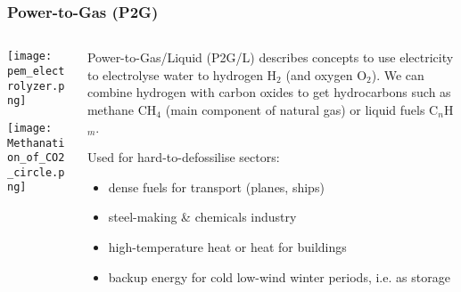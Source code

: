 \documentclass[10pt,aspectratio=169,dvipsnames]{beamer}
\let\olditem\item
\renewcommand{\item}{%
\olditem\vspace{5pt}}
\begin{document}
\begin{frame}
  \frametitle{Power-to-Gas (P2G)}

  \begin{columns}[T]
    \begin{column}{4cm}
      \texttt{[image: pem\_electrolyzer.png]}


      \vspace{.4cm}

      \texttt{[image: Methanation\_of\_CO2\_circle.png]}
    \end{column}
    \begin{column}{7cm}

      Power-to-Gas/Liquid (P2G/L) describes concepts to use electricity to
      electrolyse water to \alert{hydrogen} H$_2$ (and oxygen O$_2$).
      We can combine hydrogen with carbon oxides to get
      \alert{hydrocarbons} such as methane CH$_4$ (main component of
      natural gas) or liquid fuels C$_n$H$_m$.

      Used for \alert{hard-to-defossilise sectors}:
            \begin{itemize}
            \item
              \alert{dense fuels} for transport (planes, ships)
            \item \alert{steel-making} \& \alert{chemicals industry}
              \item \alert{high-temperature heat} or \alert{heat for buildings}
                \item \alert{backup energy} for cold low-wind winter periods, i.e. as storage
            \end{itemize}
    \end{column}
  \end{columns}

\end{frame}
\end{document}

